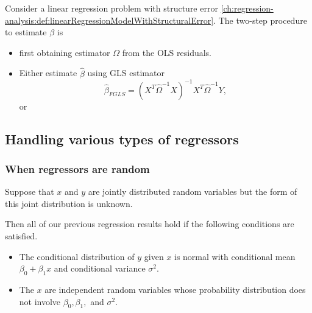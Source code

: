 \begin{refsection}
\begin{remark}[motivation]
	
\end{remark}

\begin{method}
Consider a linear regression problem with structure error \autoref{ch:regression-analysis:def:linearRegressionModelWithStructuralError}.
The two-step procedure to estimate $\beta$ is
\begin{itemize}
	\item first obtaining estimator $\Omega$ from the OLS residuals.
	\item Either estimate $\hat{\beta}$ using GLS estimator
	$$\hat{\beta}_{FGLS} = (X^T\hat{\Omega}^{-1}X)^{-1}X^T\hat{\Omega}^{-1}Y,$$
	or 
\end{itemize}	
\end{method}


\subsection{Handling various types of regressors}

\subsubsection{When regressors are random}








\begin{note}\cite[49]{montgomery2012introduction}
Suppose that $x$ and $y$ are jointly distributed random variables but the form of this joint distribution is unknown.

Then all of our previous regression results hold if the following conditions are satisfied.
\begin{itemize}
	\item The conditional distribution of $y$ given $x$ is normal with conditional mean $\beta_0 + \beta_1 x$ and conditional variance $\sigma^2$.
	\item The $x$ are independent random variables whose probability distribution does not involve $\beta_0,\beta_1,$ and $\sigma^2$.
\end{itemize}	
\end{note}



\end{refsection}

